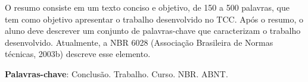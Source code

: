 %
%

\begin{RESUMO}
\thispagestyle{empty}
	
		\noindent O resumo consiste em um texto conciso e objetivo, de 150 a 500 palavras, que tem como objetivo apresentar o trabalho desenvolvido no TCC. Após o resumo, o aluno deve descrever um conjunto de palavras-chave que caracterizam o trabalho desenvolvido. Atualmente, a NBR 6028 (Associação Brasileira de Normas técnicas, 2003b) descreve esse elemento.

		\vspace*{0.5cm}\noindent\textbf{Palavras-chave}: Conclusão. Trabalho. Curso. NBR. ABNT.
		

\end{RESUMO}


